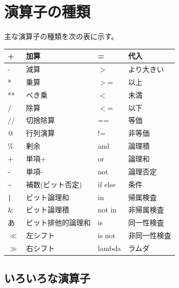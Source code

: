 \documentclass[11pt,a4paper]{jreport}
\begin{document}
\section{演算子の種類}
主な演算子の種類を次の表に示す。
\begin{table}[htbp]
 \begin{center}
  \begin{tabular}{|ll||ll|} \hline
   +                      & 加算               & =       & 代入         \\ \hline
   -                      & 減算               & $>$     & より大きい   \\ \hline
   *                      & 乗算               & $>$=    & 以上         \\ \hline
   **                     & べき乗             & $<$     & 未満         \\ \hline
   /                      & 除算               & $<$=    & 以下         \\ \hline
   //                     & 切捨除算           & ==      & 等価         \\ \hline
   @                      & 行列演算           & !=      & 非等価       \\ \hline
   \%                     & 剰余               & and     & 論理積       \\ \hline
   +                      & 単項+              & or      & 論理和       \\ \hline
   -                      & 単項-              & not     & 論理否定     \\ \hline
   \textasciitilde        & 補数(ビット否定)   & if else & 条件         \\ \hline
   \verb+|+ & ビット論理和       & in      & 帰属検査     \\ \hline
   \&                     & ビット論理積       & not in  & 非帰属検査   \\ \hline
   あ                     & ビット排他的論理和 & is      & 同一性検査   \\ \hline
   $\ll$                    & 左シフト           & is not  & 非同一性検査 \\ \hline
   $\gg$                    & 右シフト           & lambda  & ラムダ       \\ \hline
  \end{tabular}
 \end{center}
\end{table}


\subsection{いろいろな演算子}
\end{document}
